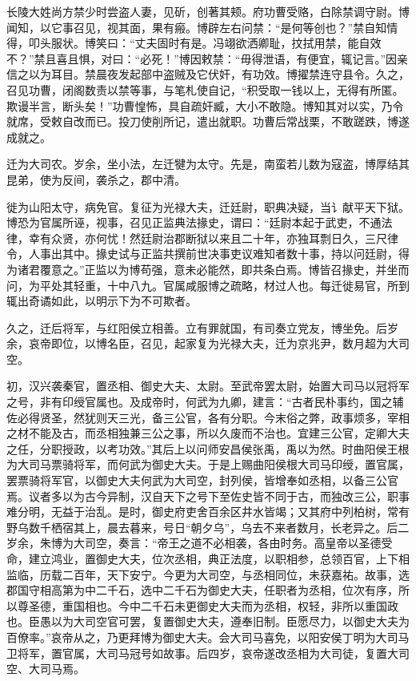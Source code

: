 \documentclass[]{article}
\begin{document}
长陵大姓尚方禁少时尝盗人妻，见斫，创著其颊。府功曹受赂，白除禁调守尉。博闻知，以它事召见，视其面，果有瘢。博辟左右问禁：``是何等创也？''禁自知情得，叩头服状。博笑曰：``丈夫固时有是。冯翊欲洒卿耻，抆拭用禁，能自效不？''禁且喜且惧，对曰：``必死！''博因敕禁：``毋得泄语，有便宜，辄记言。''因亲信之以为耳目。禁晨夜发起部中盗贼及它伏奸，有功效。博擢禁连守县令。久之，召见功曹，闭阁数责以禁等事，与笔札使自记，``积受取一钱以上，无得有所匿。欺谩半言，断头矣！''功曹惶怖，具自疏奸臧，大小不敢隐。博知其对以实，乃令就席，受敕自改而已。投刀使削所记，遣出就职。功曹后常战栗，不敢蹉跌，博遂成就之。

迁为大司农。岁余，坐小法，左迁犍为太守。先是，南蛮若儿数为寇盗，博厚结其昆弟，使为反间，袭杀之，郡中清。

徙为山阳太守，病免官。复征为光禄大夫，迁廷尉，职典决疑，当讠献平天下狱。博恐为官属所诬，视事，召见正监典法掾史，谓曰：``廷尉本起于武吏，不通法律，幸有众贤，亦何忧！然廷尉治郡断狱以来且二十年，亦独耳剽日久，三尺律令，人事出其中。掾史试与正监共撰前世决事吏议难知者数十事，持以问廷尉，得为诸君覆意之。''正监以为博苟强，意未必能然，即共条白焉。博皆召掾史，并坐而问，为平处其轻重，十中八九。官属咸服博之疏略，材过人也。每迁徙易官，所到辄出奇谲如此，以明示下为不可欺者。

久之，迁后将军，与红阳侯立相善。立有罪就国，有司奏立党友，博坐免。后岁余，哀帝即位，以博名臣，召见，起家复为光禄大夫，迁为京兆尹，数月超为大司空。

初，汉兴袭秦官，置丞相、御史大夫、太尉。至武帝罢太尉，始置大司马以冠将军之号，非有印绶官属也。及成帝时，何武为九卿，建言：``古者民朴事约，国之辅佐必得贤圣，然犹则天三光，备三公官，各有分职。今末俗之弊，政事烦多，宰相之材不能及古，而丞相独兼三公之事，所以久废而不治也。宜建三公官，定卿大夫之任，分职授政，以考功效。''其后上以问师安昌侯张禹，禹以为然。时曲阳侯王根为大司马票骑将军，而何武为御史大夫。于是上赐曲阳侯根大司马印绶，置官属，罢票骑将军官，以御史大夫何武为大司空，封列侯，皆增奉如丞相，以备三公官焉。议者多以为古今异制，汉自天下之号下至佐史皆不同于古，而独改三公，职事难分明，无益于治乱。是时，御史府吏舍百余区井水皆竭；又其府中列柏树，常有野乌数千栖宿其上，晨去暮来，号日``朝夕乌''，乌去不来者数月，长老异之。后二岁余，朱博为大司空，奏言：``帝王之道不必相袭，各由时务。高皇帝以圣德受命，建立鸿业，置御史大夫，位次丞相，典正法度，以职相参，总领百官，上下相监临，历载二百年，天下安宁。今更为大司空，与丞相同位，未获嘉祐。故事，选郡国守相高第为中二千石，选中二千石为御史大夫，任职者为丞相，位次有序，所以尊圣德，重国相也。今中二千石未更御史大夫而为丞相，权轻，非所以重国政也。臣愚以为大司空官可罢，复置御史大夫，遵奉旧制。臣愿尽力，以御史大夫为百僚率。''哀帝从之，乃更拜博为御史大夫。会大司马喜免，以阳安侯丁明为大司马卫将军，置官属，大司马冠号如故事。后四岁，哀帝遂改丞相为大司徒，复置大司空、大司马焉。
\end{document}
